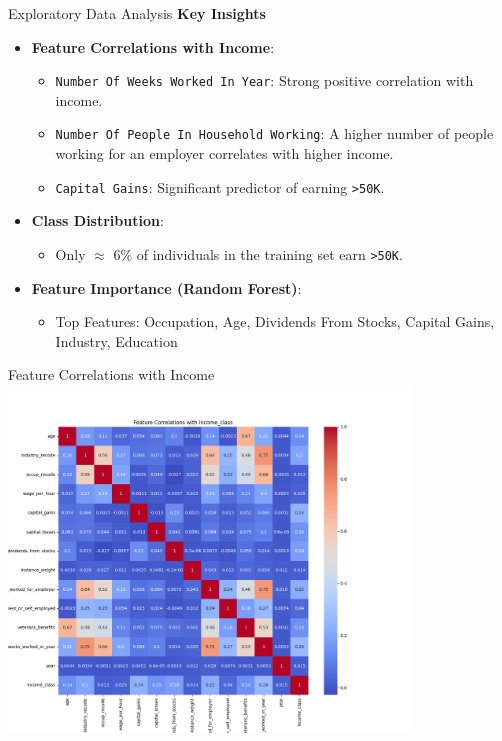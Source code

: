 \documentclass{beamer}
\begin{document}
\begin{frame}{Exploratory Data Analysis}
	\textbf{Key Insights}
	\begin{itemize}
		\item \textbf{Feature Correlations with Income}:
			\begin{itemize}
				\item \texttt{Number Of Weeks Worked In Year}: Strong positive correlation with income.
				\item \texttt{Number Of People In Household Working}: A higher number of people working for an employer correlates with higher income.
				\item \texttt{Capital Gains}: Significant predictor of earning \texttt{>50K}.
			\end{itemize}
		\item \textbf{Class Distribution}:
			\begin{itemize}
				\item Only $\approx$ 6\% of individuals in the training set earn \texttt{>50K}.
			\end{itemize}
		\item \textbf{Feature Importance (Random Forest)}:
			\begin{itemize}
				\item Top Features: Occupation, Age, Dividends From Stocks, Capital Gains, Industry, Education
			\end{itemize}
	\end{itemize}
\end{frame}

\begin{frame}{Feature Correlations with Income}
	\includegraphics[width=0.8\textwidth]{Figure_2.png}
\end{frame}
\end{document}

